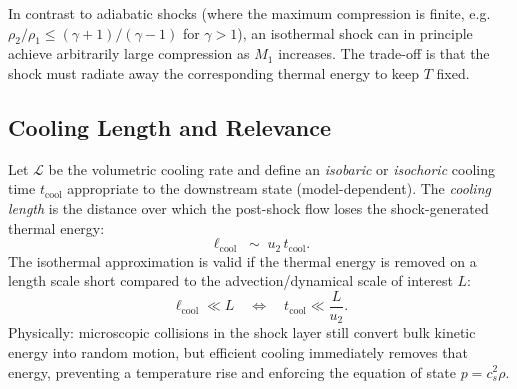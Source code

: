 \begin{remark}
In contrast to adiabatic shocks (where the maximum compression is finite, e.g.\ $\rho_2/\rho_1 \le (\gamma+1)/(\gamma-1)$ for $\gamma>1$), an isothermal shock can in principle achieve arbitrarily large compression as $M_1$ increases. The trade-off is that the shock must radiate away the corresponding thermal energy to keep $T$ fixed.
\end{remark}

\subsection*{Cooling Length and Relevance}

Let $\mathcal{L}$ be the volumetric cooling rate and define an \emph{isobaric} or \emph{isochoric} cooling time $t_{\mathrm{cool}}$ appropriate to the downstream state (model-dependent). The \emph{cooling length} is the distance over which the post-shock flow loses the shock-generated thermal energy:
\begin{equation}
\ell_{\mathrm{cool}} \;\sim\; u_2\, t_{\mathrm{cool}}.
\end{equation}
The isothermal approximation is valid if the thermal energy is removed on a length scale short compared to the advection/dynamical scale of interest $L$:
\[
\ell_{\mathrm{cool}} \ll L
\quad\Longleftrightarrow\quad
t_{\mathrm{cool}} \ll \frac{L}{u_2}.
\]
Physically: microscopic collisions in the shock layer still convert bulk kinetic energy into random motion, but efficient cooling immediately removes that energy, preventing a temperature rise and enforcing the equation of state $p=c_s^2\rho$.


